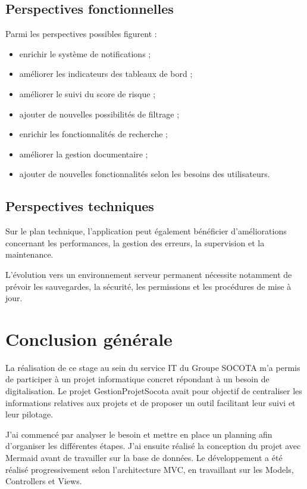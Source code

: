 \documentclass[12pt,a4paper,oneside]{report}
\begin{document}
\section{Perspectives fonctionnelles}

Parmi les perspectives possibles figurent :

\begin{itemize}
    \item enrichir le système de notifications ;
    \item améliorer les indicateurs des tableaux de bord ;
    \item améliorer le suivi du score de risque ;
    \item ajouter de nouvelles possibilités de filtrage ;
    \item enrichir les fonctionnalités de recherche ;
    \item améliorer la gestion documentaire ;
    \item ajouter de nouvelles fonctionnalités selon les besoins des utilisateurs.
\end{itemize}

\section{Perspectives techniques}

Sur le plan technique, l'application peut également bénéficier d'améliorations concernant les performances, la gestion des erreurs, la supervision et la maintenance.

L'évolution vers un environnement serveur permanent nécessite notamment de prévoir les sauvegardes, la sécurité, les permissions et les procédures de mise à jour.

\chapter{Conclusion générale}

La réalisation de ce stage au sein du service IT du Groupe SOCOTA m'a permis de participer à un projet informatique concret répondant à un besoin de digitalisation. Le projet GestionProjetSocota avait pour objectif de centraliser les informations relatives aux projets et de proposer un outil facilitant leur suivi et leur pilotage.

J'ai commencé par analyser le besoin et mettre en place un planning afin d'organiser les différentes étapes. J'ai ensuite réalisé la conception du projet avec Mermaid avant de travailler sur la base de données. Le développement a été réalisé progressivement selon l'architecture MVC, en travaillant sur les Models, Controllers et Views.
\end{document}
